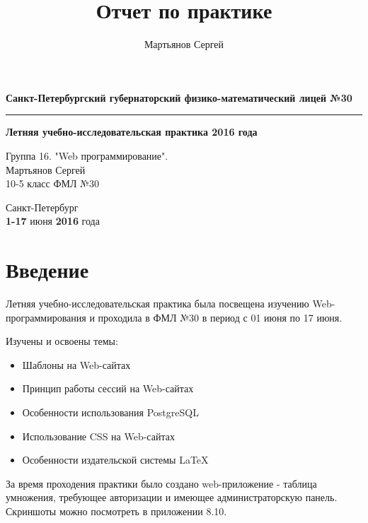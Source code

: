 \documentclass[a4paper]{article}
\author{Мартьянов Сергей}
\title{Отчет по практике}
\begin{document}
\begin{titlepage}
\begin{center}
\begin{LARGE}
\textbf{Санкт-Петербургский губернаторский
физико-математический лицей №30}
\rule{\textwidth}{0.4pt}
\textbf{Летняя учебно-исследовательская практика 2016 года}

\vspace{3cm}
Группа 16. "Web программирование". \\
Мартьянов Сергей \\
10-5 класс ФМЛ №30
\end{LARGE}

\begin{large}
\vspace{10cm}
Санкт-Петербург \\
\textbf{1-17} июня \textbf{2016} года
\end{large}
\end{center}
\end{titlepage}

\tableofcontents

\pagebreak

\section{Введение}
Летняя учебно-исследовательская практика была посвещена изучению Web-программирования и проходила в ФМЛ №30 в период с 01 июня по 17 июня.

Изучены и освоены темы:
\begin{itemize}
\item Шаблоны на Web-сайтах
\item Принцип работы сессий на Web-сайтах
\item Особенности использования PostgreSQL
\item Использование CSS на Web-сайтах
\item Особенности издательской системы \LaTeX{}
\end{itemize}

За время проходения практики было создано web-приложение - таблица умножения, требующее авторизации и имеющее администраторскую панель. Скриншоты можно посмотреть в приложении 8.10.
\end{document}

